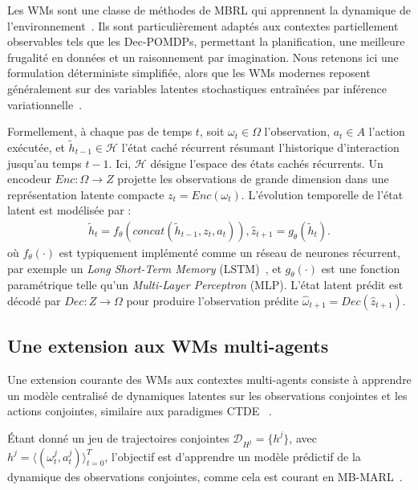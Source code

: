 \documentclass[final]{jfsma}
\theoremstyle{plain}
\theoremstyle{definition}
\theoremstyle{remark}
\begin{document}
Les WMs sont une classe de méthodes de MBRL
qui apprennent la dynamique de l'environnement~\cite{ha2018worldmodels,hafner2020dreamer}.
Ils sont particulièrement adaptés aux contextes partiellement observables tels que les Dec-POMDPs,
permettant la planification, une meilleure frugalité en données et un raisonnement par imagination.
Nous retenons ici une formulation déterministe simplifiée, alors que
les WMs modernes reposent généralement sur des variables latentes stochastiques entraînées par inférence variationnelle~\cite{hafner2019learning,hafner2020dreamer}.

Formellement, à chaque pas de temps $t$, soit $\omega_t \in \Omega$ l'observation,
$a_t \in A$ l'action exécutée, et $\tilde{h}_{t-1} \in \mathcal{H}$ l'état caché récurrent résumant l'historique d'interaction jusqu'au temps $t-1$. Ici, $\mathcal{H}$ désigne l'espace des états cachés récurrents. Un encodeur $Enc : \Omega \rightarrow Z$ projette les observations de grande dimension dans une représentation latente compacte $z_t = Enc(\omega_t)$.
%
L'évolution temporelle de l'état latent est modélisée par :
\[
  \begin{aligned}
    \tilde{h}_t  = f_{\theta}(concat(\tilde{h}_{t-1}, z_t, a_t)), \hat{z}_{t+1} = g_{\theta}(\tilde{h}_t).
  \end{aligned}
\]
où $f_{\theta}(\cdot)$ est typiquement implémenté comme un réseau de neurones récurrent,
par exemple un \textit{Long Short-Term Memory} (LSTM)~\cite{hochreiter1997long},
et $g_{\theta}(\cdot)$ est une fonction paramétrique telle qu'un \textit{Multi-Layer Perceptron} (MLP).
%
L'état latent prédit est décodé par
$Dec : Z \rightarrow \Omega$ pour produire l'observation prédite
$\hat{\omega}_{t+1} = Dec(\hat{z}_{t+1})$.


\subsection{Une extension aux WMs multi-agents}
\label{sec:mawm_basics}

Une extension courante des WMs aux contextes multi-agents consiste à apprendre un modèle centralisé de dynamiques latentes sur les observations conjointes et les actions conjointes, similaire aux paradigmes CTDE
~\cite{Wang2022modelbasedmultiagentreinforcementlearning}.

Étant donné un jeu de trajectoires conjointes $\mathcal{D}_{H^j} = \{ h^j \}$, avec $h^j = \langle (\omega_t^j, a_t^j) \rangle_{t=0}^{T}$, l'objectif est d'apprendre un modèle prédictif de la dynamique des observations conjointes, comme cela est courant en MB-MARL~\cite{Wang2022modelbasedmultiagentreinforcementlearning,Xu2022mingling}.
%
\end{document}
